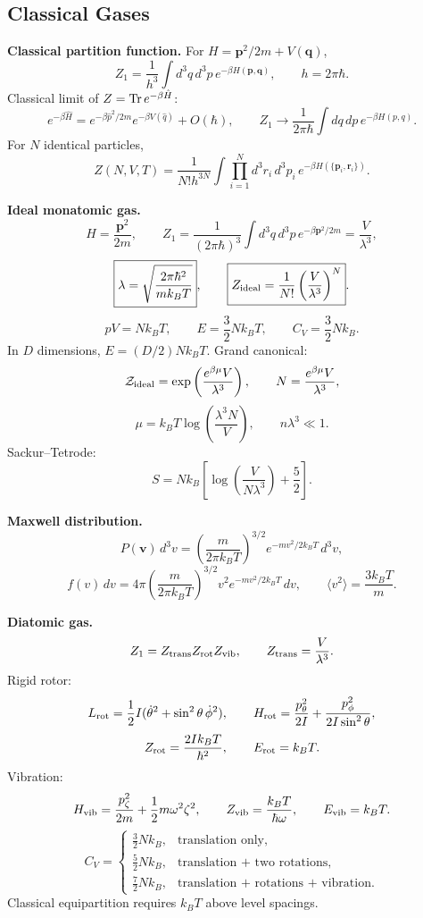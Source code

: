 \subsection{Classical Gases}

\noindent\textbf{Classical partition function.}\quad
For $H=\mathbf p^2/2m+V(\mathbf q)$,
\[
Z_1=\frac{1}{h^3}\int d^3q\,d^3p\,e^{-\beta H(\mathbf p,\mathbf q)},
\qquad h=2\pi\hbar.
\]
Classical limit of $Z={\rm Tr}\,e^{-\beta\hat H}$:
\[
e^{-\beta\hat H}
=e^{-\beta\hat p^2/2m}e^{-\beta V(\hat q)}+O(\hbar),
\qquad
Z_1\to\frac{1}{2\pi\hbar}\int dq\,dp\,e^{-\beta H(p,q)}.
\]
For $N$ identical particles,
\[
Z(N,V,T)=\frac{1}{N!h^{3N}}
\int \prod_{i=1}^N d^3r_i\,d^3p_i\,
e^{-\beta H(\{\mathbf p_i,\mathbf r_i\})}.
\]

\noindent\textbf{Ideal monatomic gas.}\quad
\[
H=\frac{\mathbf p^2}{2m},\qquad
Z_1=\frac{1}{(2\pi\hbar)^3}\int d^3q\,d^3p\,
e^{-\beta\mathbf p^2/2m}
=\frac{V}{\lambda^3},
\]
\[
\boxed{\lambda=\sqrt{\frac{2\pi\hbar^2}{mk_BT}}},
\qquad
\boxed{Z_{\rm ideal}=\frac{1}{N!}\left(\frac{V}{\lambda^3}\right)^N}.
\]
\[
\boxed{pV=Nk_BT},
\qquad
E=\frac32Nk_BT,
\qquad
\boxed{C_V=\frac32Nk_B}.
\]
In $D$ dimensions, $E=(D/2)Nk_BT$. Grand canonical:
\[
\mathcal Z_{\rm ideal}
=\exp\left(\frac{e^{\beta\mu}V}{\lambda^3}\right),
\qquad
N=\frac{e^{\beta\mu}V}{\lambda^3},
\]
\[
\boxed{\mu=k_BT\log\left(\frac{\lambda^3N}{V}\right)},
\qquad n\lambda^3\ll1.
\]
Sackur--Tetrode:
\[
\boxed{S=Nk_B\left[\log\left(\frac{V}{N\lambda^3}\right)+\frac52\right]}.
\]

\noindent\textbf{Maxwell distribution.}\quad
\[
P(\mathbf v)\,d^3v=
\left(\frac{m}{2\pi k_BT}\right)^{3/2}
e^{-mv^2/2k_BT}\,d^3v,
\]
\[
\boxed{f(v)\,dv=
4\pi\left(\frac{m}{2\pi k_BT}\right)^{3/2}
v^2e^{-mv^2/2k_BT}\,dv},
\qquad
\langle v^2\rangle=\frac{3k_BT}{m}.
\]

\noindent\textbf{Diatomic gas.}\quad
\[
Z_1=Z_{\rm trans}Z_{\rm rot}Z_{\rm vib},\qquad
Z_{\rm trans}=\frac{V}{\lambda^3}.
\]
Rigid rotor:
\[
L_{\rm rot}=\frac12I(\dot\theta^2+\sin^2\theta\,\dot\phi^2),
\qquad
H_{\rm rot}=\frac{p_\theta^2}{2I}
+\frac{p_\phi^2}{2I\sin^2\theta},
\]
\[
Z_{\rm rot}=\frac{2Ik_BT}{\hbar^2},\qquad
E_{\rm rot}=k_BT.
\]
Vibration:
\[
H_{\rm vib}=\frac{p_\zeta^2}{2m}+\frac12m\omega^2\zeta^2,
\qquad
Z_{\rm vib}=\frac{k_BT}{\hbar\omega},
\qquad
E_{\rm vib}=k_BT.
\]
\[
C_V=
\begin{cases}
\frac32Nk_B,&\text{translation only},\\
\frac52Nk_B,&\text{translation + two rotations},\\
\frac72Nk_B,&\text{translation + rotations + vibration}.
\end{cases}
\]
Classical equipartition requires $k_BT$ above level spacings.

